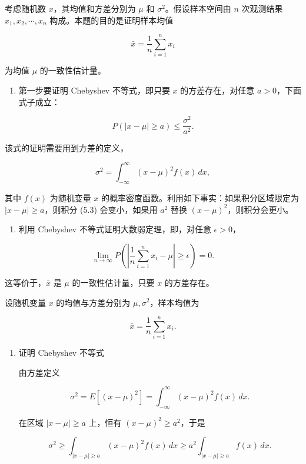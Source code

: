 ﻿





\begin{question}
考虑随机数 \(x\)，其均值和方差分别为 \(\mu\) 和
\(\sigma^2\)。假设样本空间由 \(n\) 次观测结果 \(x_1,x_2,\cdots,x_n\)
构成。本题的目的是证明样本均值

\[
\bar x=\frac1n\sum_{i=1}^{n}x_i
\]

为均值 \(\mu\) 的一致性估计量。

\begin{enumerate}
\item
  第一步要证明 Chebyshev 不等式，即只要 \(x\) 的方差存在，对任意
  \(a>0\)，下面式子成立：
\end{enumerate}

\[
P(|x-\mu|\ge a)\le \frac{\sigma^2}{a^2}.
\]

该式的证明需要用到方差的定义，

\[
\sigma^2=\int_{-\infty}^{\infty}(x-\mu)^2f(x)\,dx,
\]

其中 \(f(x)\) 为随机变量 \(x\)
的概率密度函数。利用如下事实：如果积分区域限定为
\(|x-\mu|\ge a\)，则积分 (5.3) 会变小，如果用 \(a^2\) 替换
\((x-\mu)^2\)，则积分会更小。

\begin{enumerate}[start=2]
\item
  利用 Chebyshev 不等式证明大数弱定理，即，对任意 \(\epsilon>0\)，
\end{enumerate}

\[
\lim_{n\to\infty}P\left(\left|\frac1n\sum_{i=1}^{n}x_i-\mu\right|\ge\epsilon\right)=0.
\]

这等价于，\(\bar x\) 是 \(\mu\) 的一致性估计量，只要 \(x\) 的方差存在。
\begin{solution}
设随机变量 \(x\) 的均值与方差分别为 \(\mu,\sigma^2\)，样本均值为

\[
\bar x=\frac1n\sum_{i=1}^n x_i.
\]

\begin{enumerate}
\item 证明 Chebyshev 不等式

由方差定义

\[
\sigma^2=E[(x-\mu)^2]=\int_{-\infty}^{\infty}(x-\mu)^2 f(x)\,dx.
\]

在区域 \(|x-\mu|\ge a\) 上，恒有 \((x-\mu)^2\ge a^2\)，于是

\[
\sigma^2 \ge \int_{|x-\mu|\ge a}(x-\mu)^2f(x)\,dx
\ge a^2\int_{|x-\mu|\ge a}f(x)\,dx.
\]


\end{enumerate}
\end{solution}
\end{question}
